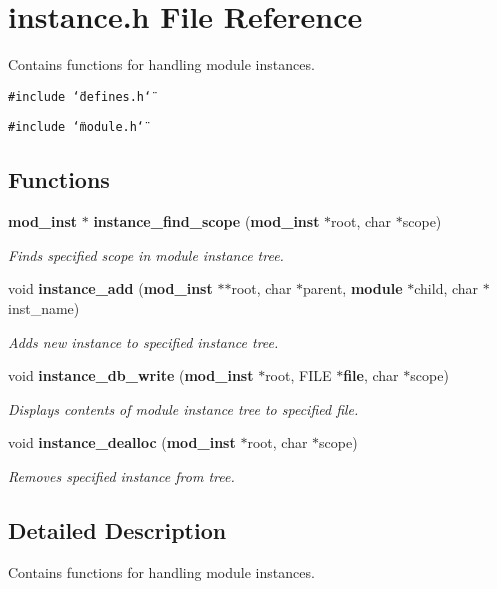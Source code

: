 \section{instance.h File Reference}
\label{instance_8h}
Contains functions for handling module instances. 


{\tt \#include \char`\"{}defines.h\char`\"{}}\par
{\tt \#include \char`\"{}module.h\char`\"{}}\par
\subsection*{Functions}
\begin{CompactItemize}
\item 
{\bf mod\_\-inst} $\ast$ {\bf instance\_\-find\_\-scope} ({\bf mod\_\-inst} $\ast$root, char $\ast$scope)
\begin{CompactList}\small\item\em Finds specified scope in module instance tree.\item\end{CompactList}\item 
void {\bf instance\_\-add} ({\bf mod\_\-inst} $\ast$$\ast$root, char $\ast$parent, {\bf module} $\ast$child, char $\ast$inst\_\-name)
\begin{CompactList}\small\item\em Adds new instance to specified instance tree.\item\end{CompactList}\item 
void {\bf instance\_\-db\_\-write} ({\bf mod\_\-inst} $\ast$root, FILE $\ast${\bf file}, char $\ast$scope)
\begin{CompactList}\small\item\em Displays contents of module instance tree to specified file.\item\end{CompactList}\item 
void {\bf instance\_\-dealloc} ({\bf mod\_\-inst} $\ast$root, char $\ast$scope)
\begin{CompactList}\small\item\em Removes specified instance from tree.\item\end{CompactList}\end{CompactItemize}


\subsection{Detailed Description}
Contains functions for handling module instances.




